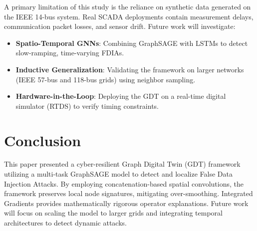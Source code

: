 \documentclass[conference]{IEEEtran}
\begin{document}
A primary limitation of this study is the reliance on synthetic data generated on the IEEE 14-bus system. Real SCADA deployments contain measurement delays, communication packet losses, and sensor drift. Future work will investigate:
\begin{itemize}
    \item \textbf{Spatio-Temporal GNNs}: Combining GraphSAGE with LSTMs to detect slow-ramping, time-varying FDIAs.
    \item \textbf{Inductive Generalization}: Validating the framework on larger networks (IEEE 57-bus and 118-bus grids) using neighbor sampling.
    \item \textbf{Hardware-in-the-Loop}: Deploying the GDT on a real-time digital simulator (RTDS) to verify timing constraints.
\end{itemize}

\section{Conclusion}
This paper presented a cyber-resilient Graph Digital Twin (GDT) framework utilizing a multi-task GraphSAGE model to detect and localize False Data Injection Attacks. By employing concatenation-based spatial convolutions, the framework preserves local node signatures, mitigating over-smoothing. Integrated Gradients provides mathematically rigorous operator explanations. Future work will focus on scaling the model to larger grids and integrating temporal architectures to detect dynamic attacks.
\end{document}
